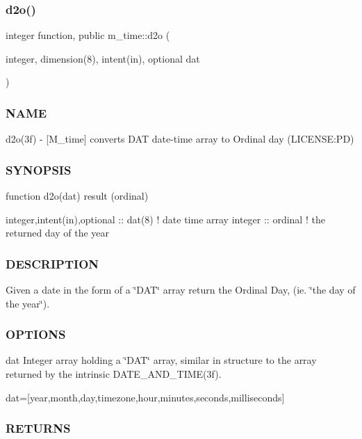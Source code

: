 \subsubsection{\texorpdfstring{d2o()}{d2o()}}
{\footnotesize\ttfamily integer function, public m\+\_\+time\+::d2o (\begin{DoxyParamCaption}\item[{integer, dimension(8), intent(in), optional}]{dat }\end{DoxyParamCaption})}



\subsubsection*{N\+A\+ME}

d2o(3f) -\/ \mbox{[}M\+\_\+time\mbox{]} converts D\+AT date-\/time array to Ordinal day (L\+I\+C\+E\+N\+SE\+:PD) 

\subsubsection*{S\+Y\+N\+O\+P\+S\+IS}

\begin{DoxyVerb}function d2o(dat) result (ordinal)

 integer,intent(in),optional :: dat(8)   ! date time array
 integer                     :: ordinal  ! the returned day of the year
\end{DoxyVerb}


\subsubsection*{D\+E\+S\+C\+R\+I\+P\+T\+I\+ON}

Given a date in the form of a \char`\"{}\+D\+A\+T\char`\"{} array return the Ordinal Day, (ie. \char`\"{}the day of the year\char`\"{}).

\subsubsection*{O\+P\+T\+I\+O\+NS}

dat Integer array holding a \char`\"{}\+D\+A\+T\char`\"{} array, similar in structure to the array returned by the intrinsic D\+A\+T\+E\+\_\+\+A\+N\+D\+\_\+\+T\+I\+M\+E(3f).

dat=\mbox{[}year,month,day,timezone,hour,minutes,seconds,milliseconds\mbox{]} \subsubsection*{R\+E\+T\+U\+R\+NS}

